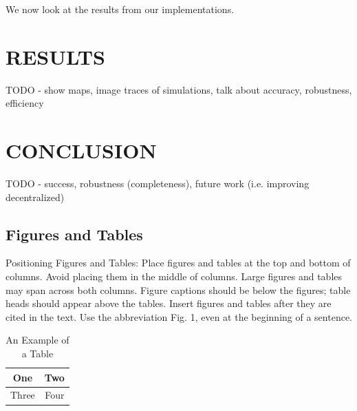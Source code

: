 \documentclass[letterpaper, 10 pt, conference]{ieeeconf}  %
\begin{document}
We now look at the results from our implementations.

\section{RESULTS}

TODO - show maps, image traces of simulations, talk about accuracy, robustness, efficiency

\section{CONCLUSION}

TODO - success, robustness (completeness), future work (i.e. improving decentralized)

\subsection{Figures and Tables}

Positioning Figures and Tables: Place figures and tables at the top and bottom of columns. Avoid placing them in the middle of columns. Large figures and tables may span across both columns. Figure captions should be below the figures; table heads should appear above the tables. Insert figures and tables after they are cited in the text. Use the abbreviation Fig. 1, even at the beginning of a sentence.

\begin{table}[h]
\caption{An Example of a Table}
\label{table_example}
\begin{center}
\begin{tabular}{|c||c|}
\hline
One & Two\\
\hline
Three & Four\\
\hline
\end{tabular}
\end{center}
\end{table}

\addtolength{\textheight}{-12cm}   %
\end{document}
